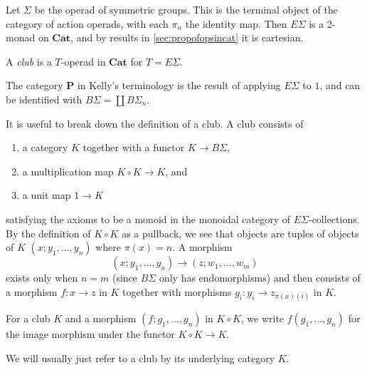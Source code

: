 \documentclass{amsbook} %
\newcommand{\mb}{\mathbf}
\numberwithin{section}{chapter}
\begin{document}
Let $\Sigma$ be the operad of symmetric groups.  This is the terminal object of the category of action operads, with each $\pi_{n}$ the identity map.  Then $E\Sigma$ is a 2-monad on $\mb{Cat}$, and by results in \cref{sec:propofopsincat} it is cartesian.

\begin{Defi}
A \textit{club} is a $T$-operad in $\mb{Cat}$ for $T = E\Sigma$.
\end{Defi}

\begin{rem}
The category $\mb{P}$ in Kelly's terminology is the result of applying $E\Sigma$ to $1$, and can be identified with $B\Sigma = \coprod B\Sigma_{n}$.
\end{rem}

It is useful to break down the definition of a club.  A club consists of
\begin{enumerate}
\item a category $K$ together with a functor $K \rightarrow B \Sigma$,
\item a multiplication map $K \circ K \rightarrow K$, and
\item a unit map $1 \rightarrow K$
\end{enumerate}
satisfying the axioms to be a monoid in the monoidal category of $E\Sigma$-collections.  By the definition of $K \circ K$ as a pullback, we see that objects are tuples of objects of $K$ $(x; y_{1}, \ldots, y_{n})$ where $\pi(x) = n$.  A morphism
\[
(x; y_{1}, \ldots, y_{n}) \to (z; w_{1}, \ldots, w_{m})
\]
exists only when $n=m$ (since $B\Sigma$ only has endomorphisms) and then consists of a morphism $f:x \to z$ in $K$ together with morphisms $g_{i}:y_{i} \to z_{\pi(x)(i)}$ in $K$.

\begin{nota}\label{nota:clubmult}
For a club $K$ and a morphism $(f; g_{1}, \ldots, g_{n})$ in $K \circ K$, we write $f(g_{1}, \ldots, g_{n})$ for the image morphism under the functor $K \circ K \rightarrow K$.
\end{nota}

We will usually just refer to a club by its underlying category $K$.
\end{document}
